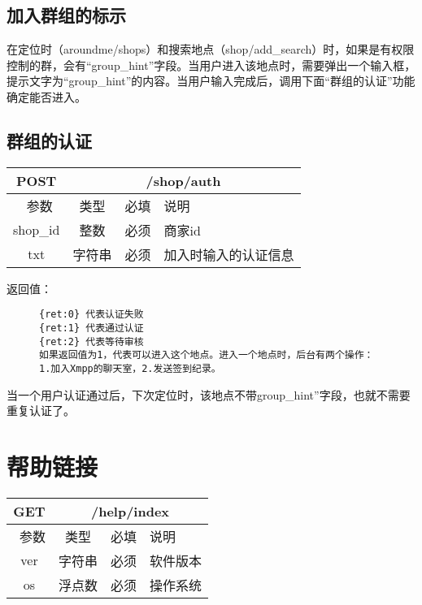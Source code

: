 \documentclass[cs4size]{ctexartutf8}
\begin{document}
\subsection{加入群组的标示}
在定位时（aroundme/shops）和搜索地点（shop/add\_search）时，如果是有权限控制的群，会有“group\_hint”字段。当用户进入该地点时，需要弹出一个输入框，提示文字为“group\_hint”的内容。当用户输入完成后，调用下面“群组的认证”功能确定能否进入。


\subsection{群组的认证}
\begin{table}[H]
   \begin{center}
\begin{tabular}{|c|c|c|p{12cm}|}
\hline
POST & \multicolumn{3}{|c|}{/shop/auth} \\
\hline\hline
 \  参数  & 类型 & 必填 &  说明  \\
   \hline
 shop\_id  & 整数 & 必须 & 商家id\\ 
  \hline
 txt  & 字符串 & 必须 & 加入时输入的认证信息\\
 \hline
\end{tabular}
   \end{center}
\end{table}

返回值：
\begin{figure}[H]
\begin{verbatim}
{ret:0} 代表认证失败
{ret:1} 代表通过认证
{ret:2} 代表等待审核
如果返回值为1，代表可以进入这个地点。进入一个地点时，后台有两个操作：1.加入Xmpp的聊天室，2.发送签到纪录。
\end{verbatim}
\end{figure}

当一个用户认证通过后，下次定位时，该地点不带group\_hint”字段，也就不需要重复认证了。








\section{帮助链接}

\begin{table}[H]
   \begin{center}
\begin{tabular}{|c|c|c|p{12cm}|}
\hline
GET & \multicolumn{3}{|c|}{/help/index} \\
\hline\hline
 \  参数  & 类型 & 必填 &  说明  \\
 \hline
 ver  & 字符串 & 必须 & 软件版本\\
\hline
 os  & 浮点数 & 必须 & 操作系统\\
\hline
\end{tabular}
   \end{center}
\end{table}
\end{document}
